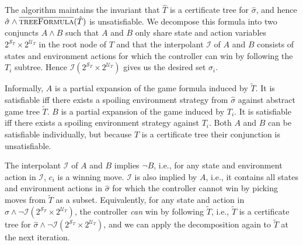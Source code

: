 The algorithm maintains the invariant that $\hat{T}$ is a certificate tree for $\hat{\sigma}$, and hence $\hat{\sigma} \land \textsc{$\overline{\mbox{treeFormula}}$}(\hat{T})$ is unsatisfiable.  We decompose this formula into two conjuncts $A \land B$ such that $A$ and $B$ only share state and action variables $2^{\mathcal{S}_T} \times 2^{\mathcal{U}_T}$ in the root node of $T$ and that the interpolant $\mathcal{I}$ of $A$ and $B$ consists of states and environment actions for which the controller can win by following the $T_i$ subtree.  Hence $\mathcal{I}(2^{\mathcal{S}_T} \times 2^{\mathcal{U}_T})$ gives us the desired set $\sigma_i$.  

Informally, $A$ is a partial expansion of the game formula induced by $\tilde{T}$.  It is satisfiable iff there exists a spoiling environment strategy from $\hat{\sigma}$ against abstract game tree $\tilde{T}$.  $B$ is a partial expansion of the game induced by $T_i$.  It is satisfiable iff there exists a spoiling environment strategy against $T_i$.  Both $A$ and $B$ can be satisfiable individually, but because $T$ is a certificate tree their conjunction is unsatisfiable.

The interpolant $\mathcal{I}$ of $A$ and $B$ implies $\neg B$, i.e., for any state and environment action in $\mathcal{I}$, $c_i$ is a winning move.  $\mathcal{I}$ is also implied by $A$, i.e., it contains all states and environment actions in $\hat{\sigma}$ for which the controller cannot win by picking moves from $\tilde{T}$ as a subset.  Equivalently, for any state and action in $\hat{\sigma} \land \neg \mathcal{I}(2^{\mathcal{S}_T} \times 2^{\mathcal{U}_T})$, the controller \emph{can} win by following $\tilde{T}$, i.e., $\tilde{T}$ is a certificate tree for $\hat{\sigma} \land \neg \mathcal{I}(2^{\mathcal{S}_T} \times 2^{\mathcal{U}_T})$, and we can apply the decomposition again to $\tilde{T}$ at the next iteration.


\makeatletter
\newcommand{\pushright}[1]{\ifmeasuring@#1\else\omit\hfill$\displaystyle#1$\fi\ignorespaces}
\makeatother

